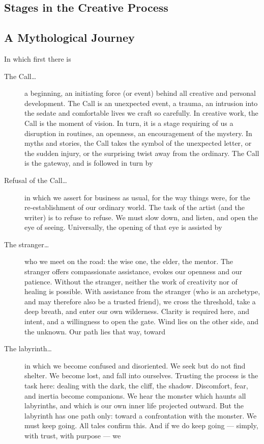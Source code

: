 \documentclass[letterpaper,oneside]{memoir}
\begin{document}
\begin{description}
\section{Stages in the Creative Process}
\subsection{A Mythological Journey}
In which first there is 
\begin{description}
\item[The Call\ldots] a beginning, an initiating force (or event) behind all creative and personal development. The Call is an unexpected event, a trauma, an intrusion into the sedate and comfortable lives we craft so carefully. In creative work, the Call is the moment of vision. In turn, it is a stage requiring of us a disruption in routines, an openness, an encouragement of the mystery. In myths and stories, the Call takes the symbol of the unexpected letter, or the sudden injury, or the surprising twist away from the ordinary. The Call is the gateway, and is followed in turn by

\item[Refusal of the Call\ldots] in which we assert for business as usual, for the way things were, for the re-establishment of our ordinary world. The task of the artist (and the writer) is to refuse to refuse. We must slow down, and listen, and open the eye of seeing. Universally, the opening of that eye is assisted by

\item[The stranger\ldots] who we meet on the road: the wise one, the elder, the mentor. The stranger offers compassionate assistance, evokes our openness and our patience. Without the stranger, neither the work of creativity nor of healing is possible. With assistance from the stranger (who is an archetype, and may therefore also be a trusted friend), we cross the threshold, take a deep breath, and enter our own wilderness. Clarity is required here, and intent, and a willingness to open the gate. Wind lies on the other side, and the unknown. Our path lies that way, toward

\item[The labyrinth\ldots] in which we become confused and disoriented. We seek but do not find shelter. We become lost, and fall into ourselves. Trusting the process is the task here: dealing with the dark, the cliff, the shadow. Discomfort, fear, and inertia become companions. We hear the monster which haunts all labyrinths, and which is our own inner life projected outward. But the labyrinth has one path only: toward a confrontation with the monster. We must keep going. All tales confirm this. And if we do keep going --- simply, with trust, with purpose --- we


\end{description}
\end{description}
\end{document}
